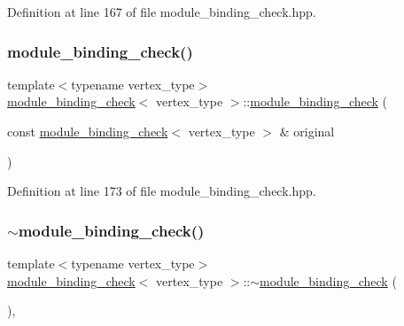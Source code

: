 Definition at line 167 of file module\+\_\+binding\+\_\+check.\+hpp.

\mbox{\label{structmodule__binding__check_a6f50b5b2a0f312e676f426a83cae91df}} 
\subsubsection{\texorpdfstring{module\+\_\+binding\+\_\+check()}{module\_binding\_check()}\hspace{0.1cm}{\footnotesize\ttfamily [2/2]}}
{\footnotesize\ttfamily template$<$typename vertex\+\_\+type$>$ \\
\hyperlink{structmodule__binding__check}{module\+\_\+binding\+\_\+check}$<$ vertex\+\_\+type $>$\+::\hyperlink{structmodule__binding__check}{module\+\_\+binding\+\_\+check} (\begin{DoxyParamCaption}\item[{const \hyperlink{structmodule__binding__check}{module\+\_\+binding\+\_\+check}$<$ vertex\+\_\+type $>$ \&}]{original }\end{DoxyParamCaption})\hspace{0.3cm}{\ttfamily [inline]}}



Definition at line 173 of file module\+\_\+binding\+\_\+check.\+hpp.

\mbox{\label{structmodule__binding__check_a80b590960dbdf52cd5ee91becac20edc}} 
\subsubsection{\texorpdfstring{$\sim$module\+\_\+binding\+\_\+check()}{~module\_binding\_check()}}
{\footnotesize\ttfamily template$<$typename vertex\+\_\+type$>$ \\
\hyperlink{structmodule__binding__check}{module\+\_\+binding\+\_\+check}$<$ vertex\+\_\+type $>$\+::$\sim$\hyperlink{structmodule__binding__check}{module\+\_\+binding\+\_\+check} (\begin{DoxyParamCaption}{ }\end{DoxyParamCaption})\hspace{0.3cm}{\ttfamily [override]}, {\ttfamily [default]}}



